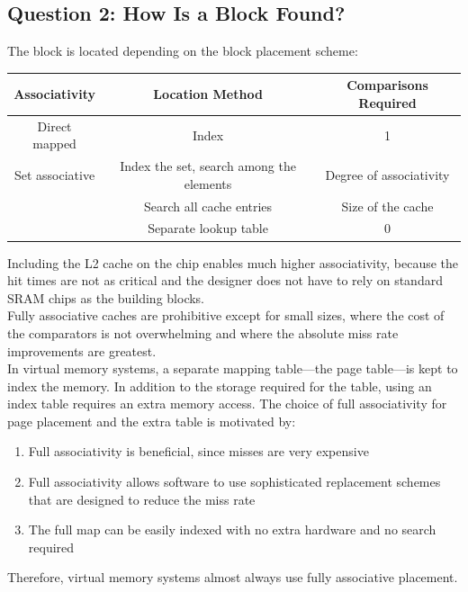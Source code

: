 \documentclass[12pt]{article}
\theoremstyle{definition}
\begin{document}
  \subsection{Question 2: How Is a Block Found?}
  The block is located depending on the block placement scheme:
  \begin{center}
  \begin{tabular}{| c | c | c |}
  \hline
  Associativity & Location Method & Comparisons Required \\
  \hline
  {\small  Direct mapped} & {\small Index} & {\small 1} \\
  \hline
  {\small Set associative} & {\small Index the set, search among the elements}
  & {\small Degree of associativity} \\
  \hline
  {\small \multirow{2}{*}{Full}} & {\small Search all cache entries}
  & {\small Size of the cache} \\
  \cline{2-3}
  & {\small Separate lookup table} & {\small 0} \\
  \hline
  \end{tabular}
  \end{center}
  Including the L2 cache on the chip enables much higher associativity, because the hit times are not as critical and the designer does not have to rely on standard SRAM chips as the building blocks. \\
  Fully associative caches are prohibitive except for small sizes, where the cost of the comparators is not overwhelming and where the absolute miss rate improvements are greatest. \\

  In virtual memory systems, a separate mapping table---the page table---is kept to index the memory.
  In addition to the storage required for the table, using an index table requires an extra memory access.
  The choice of full associativity for page placement and the extra table is motivated by:
  \begin{enumerate}
    \item Full associativity is beneficial, since misses are very expensive
    \item Full associativity allows software to use sophisticated replacement schemes that are designed to reduce the miss rate
    \item The full map can be easily indexed with no extra hardware and no search required
  \end{enumerate}
  Therefore, virtual memory systems almost always use fully associative placement. \\
\end{document}
